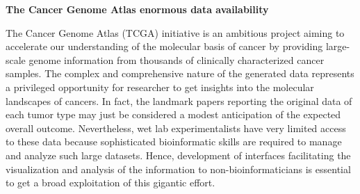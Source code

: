 \documentclass[a0,portrait]{a0poster}
\newenvironment{Section}[1]{
\par 
\flushleft
\colorbox{boxcol}{ 				%
\sffamily\large\color{black} #1%
\hspace{0.5cm}}
\par\nobreak 
\nointerlineskip 						%
\setlength\parskip{-1pt}					%
\begin{lrbox}\envbox						%
\begin{minipage}{0.95\columnwidth}		%
}
{\par
\end{minipage}\end{lrbox}				%
\fcolorbox{boxcol}{fillcol}{\usebox\envbox}	%
\vspace{1cm}							%
}
\begin{document}
\begin{multicols}{2} %








\vspace{-14cm}

\begin{Section}{\textbf{The Cancer Genome Atlas enormous data availability}}

The Cancer Genome Atlas (TCGA) initiative is an ambitious project aiming to accelerate our understanding of the molecular basis of cancer by providing large-scale genome information from thousands of clinically characterized cancer samples. The complex and comprehensive  nature of the generated data represents a privileged opportunity for researcher to get insights into the molecular landscapes of cancers. In fact, the landmark papers reporting the original data of each tumor type may just be considered a modest anticipation of the expected overall outcome. Nevertheless,  wet lab experimentalists have very limited access to these data because sophisticated bioinformatic skills are required to manage and analyze such large datasets. Hence, development of interfaces facilitating the visualization and analysis of the information to non-bioinformaticians is essential to get a broad exploitation of this gigantic effort.



\end{Section}
\end{multicols}
\end{document}
